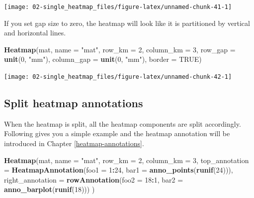 \documentclass[]{book}
\newenvironment{Shaded}{\begin{snugshade}}{\end{snugshade}}
\newcommand{\KeywordTok}[1]{\textcolor[rgb]{0.13,0.29,0.53}{\textbf{#1}}}
\newcommand{\DataTypeTok}[1]{\textcolor[rgb]{0.13,0.29,0.53}{#1}}
\newcommand{\DecValTok}[1]{\textcolor[rgb]{0.00,0.00,0.81}{#1}}
\newcommand{\StringTok}[1]{\textcolor[rgb]{0.31,0.60,0.02}{#1}}
\newcommand{\OtherTok}[1]{\textcolor[rgb]{0.56,0.35,0.01}{#1}}
\newcommand{\OperatorTok}[1]{\textcolor[rgb]{0.81,0.36,0.00}{\textbf{#1}}}
\newcommand{\NormalTok}[1]{#1}
\theoremstyle{definition}
\theoremstyle{definition}
\theoremstyle{definition}
\theoremstyle{remark}
\begin{document}
\begin{center}\texttt{[image: 02-single\_heatmap\_files/figure-latex/unnamed-chunk-41-1]} \end{center}

If you set gap size to zero, the heatmap will look like it is
partitioned by vertical and horizontal lines.

\begin{Shaded}
\begin{Highlighting}[]
\KeywordTok{Heatmap}\NormalTok{(mat, }\DataTypeTok{name =} \StringTok{"mat"}\NormalTok{, }\DataTypeTok{row_km =} \DecValTok{2}\NormalTok{, }\DataTypeTok{column_km =} \DecValTok{3}\NormalTok{, }
    \DataTypeTok{row_gap =} \KeywordTok{unit}\NormalTok{(}\DecValTok{0}\NormalTok{, }\StringTok{"mm"}\NormalTok{), }\DataTypeTok{column_gap =} \KeywordTok{unit}\NormalTok{(}\DecValTok{0}\NormalTok{, }\StringTok{"mm"}\NormalTok{), }\DataTypeTok{border =} \OtherTok{TRUE}\NormalTok{)}
\end{Highlighting}
\end{Shaded}

\begin{center}\texttt{[image: 02-single\_heatmap\_files/figure-latex/unnamed-chunk-42-1]} \end{center}

\subsection{Split heatmap annotations}\label{split-heatmap-annotations}

When the heatmap is split, all the heatmap components are split
accordingly. Following gives you a simple example and the heatmap
annotation will be introduced in Chapter \ref{heatmap-annotations}.

\begin{Shaded}
\begin{Highlighting}[]
\KeywordTok{Heatmap}\NormalTok{(mat, }\DataTypeTok{name =} \StringTok{"mat"}\NormalTok{, }\DataTypeTok{row_km =} \DecValTok{2}\NormalTok{, }\DataTypeTok{column_km =} \DecValTok{3}\NormalTok{,}
    \DataTypeTok{top_annotation =} \KeywordTok{HeatmapAnnotation}\NormalTok{(}\DataTypeTok{foo1 =} \DecValTok{1}\OperatorTok{:}\DecValTok{24}\NormalTok{, }\DataTypeTok{bar1 =} \KeywordTok{anno_points}\NormalTok{(}\KeywordTok{runif}\NormalTok{(}\DecValTok{24}\NormalTok{))),}
    \DataTypeTok{right_annotation =} \KeywordTok{rowAnnotation}\NormalTok{(}\DataTypeTok{foo2 =} \DecValTok{18}\OperatorTok{:}\DecValTok{1}\NormalTok{, }\DataTypeTok{bar2 =} \KeywordTok{anno_barplot}\NormalTok{(}\KeywordTok{runif}\NormalTok{(}\DecValTok{18}\NormalTok{)))}
\NormalTok{)}
\end{Highlighting}
\end{Shaded}
\end{document}
